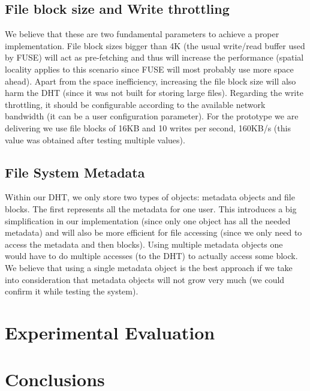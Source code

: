 \documentclass[times,9pt,article]{llncs}
\begin{document}
\subsection{File block size and Write throttling}
We believe that these are two fundamental parameters to achieve a proper implementation. File block sizes bigger than 4K (the usual write/read buffer used by FUSE) will act as pre-fetching and thus will increase the performance (spatial locality applies to this scenario since FUSE will most probably use more space ahead). Apart from the space inefficiency, increasing the file block size will also harm the DHT (since it was not built for storing large files). Regarding the write throttling, it should be configurable according to the available network bandwidth (it can be a user configuration parameter). For the prototype we are delivering we use file blocks of 16KB and 10 writes per second, 160KB/s (this value was obtained after testing multiple values).

\subsection{File System Metadata}
Within our DHT, we only store two types of objects: metadata objects and file blocks. The first represents all the metadata for one user. This introduces a big simplification in our implementation (since only one object has all the needed metadata) and will also be more efficient for file accessing (since we only need to access the metadata and then blocks). Using multiple metadata objects one would have to do multiple accesses (to the DHT) to actually access some block. We believe that using a single metadata object is the best approach if we take into consideration that metadata objects will not grow very much (we could confirm it while testing the system).

\section{Experimental Evaluation}


\section{Conclusions}
\end{document}
